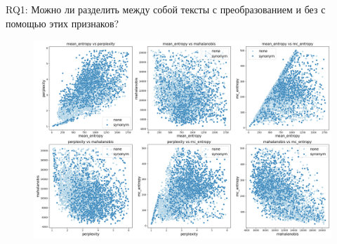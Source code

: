 \documentclass{beamer}
\begin{document}
\begin{frame}{RQ1: Можно ли разделить между собой тексты с преобразованием и без с помощью этих признаков?}
    \begin{figure}
        \centering
        \includegraphics[width=\linewidth]{images_sem2/pairplot.png}
        \label{fig:enter-label}
    \end{figure}
\end{frame}
\end{document}
